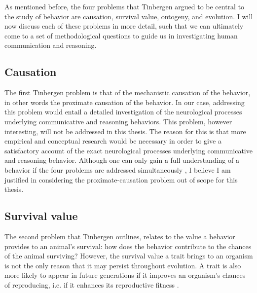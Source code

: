 As mentioned before, the four problems that Tinbergen argued to be central to the study of behavior are causation, survival value, ontogeny, and evolution. I will now discuss each of these problems in more detail, such that we can ultimately come to a set of methodological questions to guide us in investigating human communication and reasoning.


\subsection{Causation}
The first Tinbergen problem is that of the mechanistic causation of the behavior, in other words the proximate causation of the behavior. In our case, addressing this problem would entail a detailed investigation of the neurological processes underlying communicative and reasoning behaviors.
This problem, however interesting, will not be addressed in this thesis. The reason for this is that more empirical and conceptual research would be necessary in order to give a satisfactory account of the exact neurological processes underlying communicative and reasoning behavior. Although one can only gain a full understanding of a behavior if the four problems are addressed simultaneously \citep{Tinbergen63, BatesonLaland13}, I believe I am justified in considering the proximate-causation problem out of scope for this thesis.

\subsection{Survival value}
The second problem that Tinbergen outlines, relates to the value a behavior provides to an animal's survival: how does the behavior contribute to the chances of the animal surviving? However, the survival value a trait brings to an organism is not the only reason that it may persist throughout evolution. A trait is also more likely to appear in future generations if it improves an organism's chances of reproducing, i.e. if it enhances its reproductive fitness
\citep{BatesonLaland13} .

